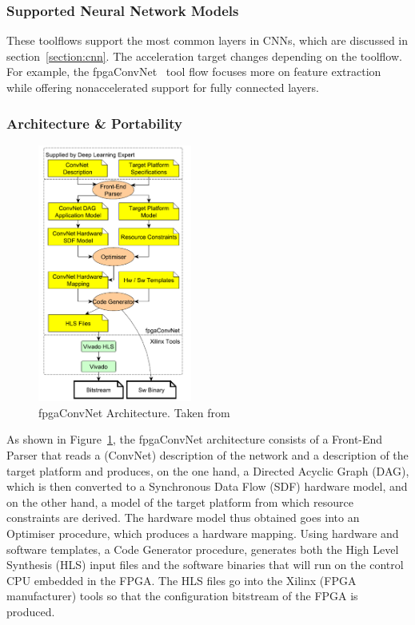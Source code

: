     \subsubsection{Supported Neural Network Models}

    These toolflows support the most common layers in CNNs, which are discussed in
    section~\ref{section:cnn}. The acceleration target changes depending on the
    toolflow.  For example, the fpgaConvNet~\cite{fpgaconvnet} tool flow focuses more
    on feature extraction while offering nonaccelerated support for fully connected
    layers.

    \subsubsection{Architecture \& Portability}

    \begin{figure}[!htbp]
        \centering
        \includegraphics[width=0.45\textwidth]{Figures/fpgaconvnet.png}
        \caption{fpgaConvNet Architecture. Taken from~\cite{fpgaconvnet}}
        \label{figure:fpgaconvnet}
    \end{figure}

    As shown in Figure~\ref{figure:fpgaconvnet}, the fpgaConvNet architecture
    consists of a Front-End Parser that reads a (ConvNet) description of the network
    and a description of the target platform and produces, on the one hand, a
    Directed Acyclic Graph (DAG), which is then converted to a Synchronous Data Flow
    (SDF) hardware model, and on the other hand, a model of the target platform from
    which resource constraints are derived. The hardware model thus obtained goes
    into an Optimiser procedure, which produces a hardware mapping. Using hardware
    and software templates, a Code Generator procedure, generates both the High
    Level Synthesis (HLS) input files and the software binaries that will run on the
    control CPU embedded in the FPGA. The HLS files go into the Xilinx (FPGA
    manufacturer) tools so that the configuration bitstream of the FPGA is produced.



